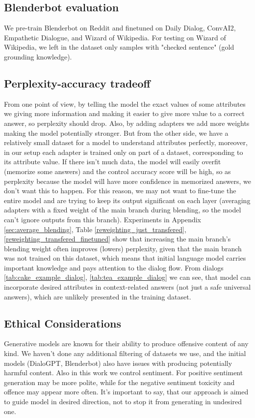 \documentclass[11pt]{article}
\begin{document}
\subsection{Blenderbot evaluation}
\label{sec:blenderbot_evaluation}
We pre-train Blenderbot on Reddit and finetuned on Daily Dialog, ConvAI2, Empathetic Dialogue, and Wizard of Wikipedia.
For testing on Wizard of Wikipedia, we left in the dataset only samples with "checked sentence"{} (gold grounding knowledge).

\subsection{Perplexity-accuracy tradeoff}
\label{sec:perplexity_accuracy_tradeoff}
From one point of view, by telling the model the exact values of some attributes we giving more information and making it easier to give more value to a correct answer, so perplexity should drop. Also, by adding adapters we add more weights making the model potentially stronger. But from the other side, we have a relatively small dataset for a model to understand attributes perfectly, moreover, in our setup each adapter is trained only on part of a dataset, corresponding to its attribute value. If there isn't much data, the model will easily overfit (memorize some answers) and the control accuracy score will be high, so as perplexity because the model will have more confidence in memorized answers, we don't want this to happen. For this reason, we may not want to fine-tune the entire model and are trying to keep its output significant on each layer (averaging adapters with a fixed weight of the main branch during blending, so the model can't ignore outputs from this branch). Experiments in Appendix \ref{sec:average_blending}, Table \ref{reweighting_just_transfered}, \ref{reweighting_transfered_finetuned} show that increasing the main branch's blending weight often improves (lowers) perplexity, given that the main branch was not trained on this dataset, which means that initial language model carries important knowledge and pays attention to the dialog flow. From dialogs \ref{tab:cake_example_dialog}, \ref{tab:tea_example_dialog} we can see, that model can incorporate desired attributes in context-related answers (not just a safe universal answers), which are unlikely presented in the training dataset.

\subsection{Ethical Considerations}
\label{sec:ethical_considerations}
Generative models are known for their ability to produce offensive content of any kind. We haven't done any additional filtering of datasets we use, and the initial models (DialoGPT, Blenderbot) also have issues with producing potentially harmful content. Also in this work we control sentiment. For positive sentiment generation may be more polite, while for the negative sentiment toxicity and offence may appear more often. It's important to say, that our approach is aimed to guide model in desired direction, not to stop it from generating in undesired one.
\end{document}
